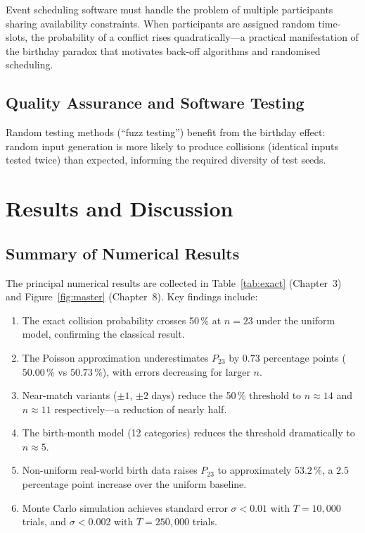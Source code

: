 \documentclass[12pt]{report}
\theoremstyle{definition}
\begin{document}
Event scheduling software must handle the problem of multiple participants sharing
availability constraints.  When participants are assigned random time-slots, the
probability of a conflict rises quadratically—a practical manifestation of the
birthday paradox that motivates back-off algorithms and randomised scheduling.

\section{Quality Assurance and Software Testing}

Random testing methods (``fuzz testing'') benefit from the birthday effect: random
input generation is more likely to produce collisions (identical inputs tested twice)
than expected, informing the required diversity of test seeds.

\chapter{Results and Discussion}

\section{Summary of Numerical Results}

The principal numerical results are collected in Table~\ref{tab:exact} (Chapter~3) and
Figure~\ref{fig:master} (Chapter~8).  Key findings include:

\begin{enumerate}
  \item The exact collision probability crosses 50\,\% at $n = 23$ under the uniform
        model, confirming the classical result.
  \item The Poisson approximation underestimates $P_{23}$ by $0.73$ percentage points
        ($50.00\,\%$ vs $50.73\,\%$), with errors decreasing for larger $n$.
  \item Near-match variants ($\pm 1$, $\pm 2$ days) reduce the 50\,\% threshold to
        $n \approx 14$ and $n \approx 11$ respectively—a reduction of nearly half.
  \item The birth-month model (12 categories) reduces the threshold dramatically to
        $n \approx 5$.
  \item Non-uniform real-world birth data raises $P_{23}$ to approximately $53.2\,\%$,
        a $2.5$ percentage point increase over the uniform baseline.
  \item Monte Carlo simulation achieves standard error $\sigma < 0.01$ with
        $T = 10{,}000$ trials, and $\sigma < 0.002$ with $T = 250{,}000$ trials.
\end{enumerate}
\end{document}
